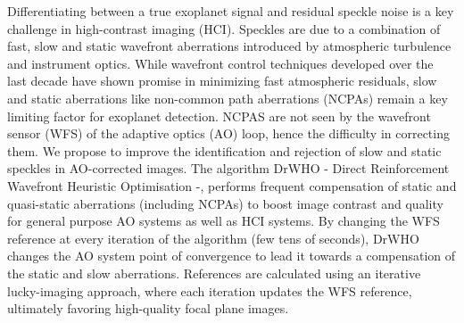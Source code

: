 \documentclass[twocolumn]{aa}
\newcommand{\anthony}[1]{\textcolor{magenta}{#1}}
\renewcommand{\v}[1]{\textcolor{red!70!white}{#1}}
\begin{document}
{%

}


  \abstract
   {
   Differentiating between a true exoplanet signal and residual speckle noise is a key challenge in high-contrast imaging (HCI).
   Speckles are due to a combination of fast, slow and static wavefront aberrations introduced by atmospheric turbulence and instrument optics.
   While wavefront control techniques developed over the last decade have shown promise in minimizing fast atmospheric residuals, slow and static aberrations like non-common path aberrations (NCPAs) remain a key limiting factor for exoplanet detection.
   NCPAS are not seen by the wavefront sensor (WFS) of the adaptive optics (AO) loop, hence the difficulty in correcting them.}
   {
   We propose to improve the identification and rejection of slow and static speckles in AO-corrected images.
   The algorithm DrWHO - Direct Reinforcement Wavefront Heuristic Optimisation -, performs frequent compensation of static and quasi-static  
   aberrations (including NCPAs) to boost image contrast and quality for general purpose AO systems as well as HCI systems. 
   }
   {By changing the WFS reference at every iteration of the algorithm (few tens of seconds), DrWHO changes the AO system point of convergence to lead it towards a compensation of the static and slow aberrations. 
   References are calculated using an iterative lucky-imaging approach, where each iteration updates the WFS reference, ultimately favoring high-quality focal plane images. 
   }
\end{document}
